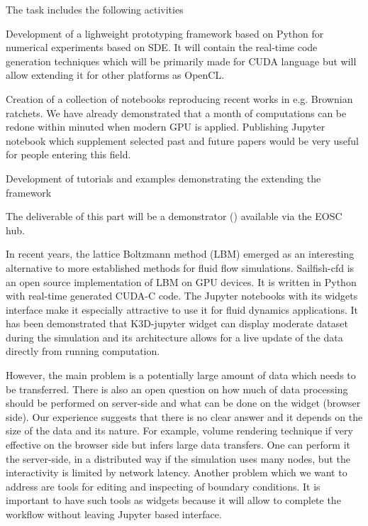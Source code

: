 \begin{task}[
  title=Application: Reproducible research based on GPU,
  id=application-gpu,
  lead=SIL,
  PM=12,
  wphases={4-36},
  partners={}
]
  The task includes the following activities
  \begin{compactitem}
  \item Development of a lighweight prototyping framework based on Python for numerical experiments based on SDE. It will contain the real-time code generation techniques which will be primarily made for CUDA language but will allow extending it for other platforms as OpenCL. 
  \item Creation of a collection of notebooks reproducing recent works in e.g. Brownian ratchets. We have already demonstrated \cite{januszewski2010accelerating,spiechowicz2015gpu} that a month of computations can be redone within minuted when modern GPU is applied. Publishing Jupyter notebook which supplement selected past and future papers would be very useful for people entering this field.  
  \item Development of tutorials and examples demonstrating the extending the framework
    
  \end{compactitem}

The deliverable of this part will be a demonstrator () available via the EOSC hub.

In recent years, the lattice Boltzmann method (LBM) emerged as an interesting alternative to more established methods for fluid flow simulations. Sailfish-cfd \cite{januszewski2014sailfish} is an open source implementation of LBM on GPU devices. It is written in Python with real-time generated CUDA-C code. The Jupyter notebooks with its widgets interface make it especially attractive to use it for fluid dynamics applications. It has been demonstrated that K3D-jupyter widget can display moderate dataset during the simulation and its architecture allows for a live update of the data directly from running computation.

However, the main problem is a potentially large amount of data which needs to be transferred. There is also an open question on how much of data processing should be performed on server-side and what can be done on the widget (browser side). Our experience suggests that there is no clear answer and it depends on the size of the data and its nature. For example, volume rendering technique if very effective on the browser side but infers large data transfers. One can perform it the server-side, in a distributed way if the simulation uses many nodes, but the interactivity is limited by network latency. 
Another problem which we want to address are tools for editing and inspecting of boundary conditions. It is important to have such tools as widgets because it will allow to complete the workflow without leaving Jupyter based interface.




\end{task}
